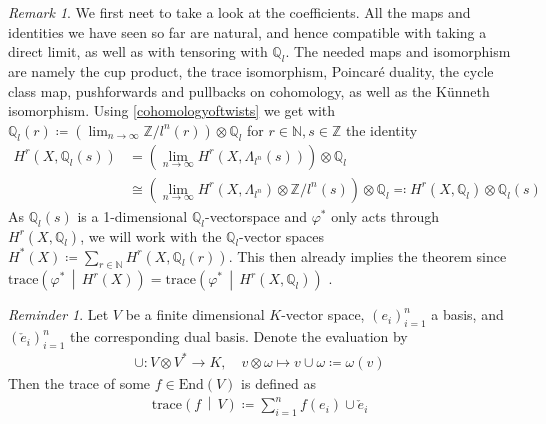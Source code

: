 \documentclass[english,headsepline=0.25pt]{scrartcl}
\theoremstyle{definition}
\theoremstyle{remark}
\newtheorem{Rem}[Def]{Remark}
\newtheorem{Rev}[Def]{Reminder}
\newcommand*{\N}{\mathds{N}}
\newcommand*{\Z}{\mathds{Z}}
\newcommand*{\Q}{\mathds{Q}}
\newcommand*{\Zmod}[1]{\Z/#1} %
\newcommand*{\Zl}{\Z_l} %
\newcommand*{\Ql}{\Q_l} %
\newcommand*{\End}[1]{\text{End}(#1)} %
\newcommand*{\M}{\Lambda}
\newcommand*{\trace}[2]{{\text{trace}\left(#1 \,\middle|\, #2 \right)}} %
\renewcommand*{\phi}{\varphi}
\newcommand*{\dual}[1]{\check{#1}} %
\begin{document}
\begin{Rem}\label{changeofcoefficients}
  We first neet to take a look at the coefficients.
  All the maps and identities we have seen so far are natural,
  and hence compatible with taking a direct limit,
  as well as with tensoring with $\Ql$.
  The needed maps and isomorphism are namely
  the cup product,
  the trace isomorphism,
  Poincaré duality,
  the cycle class map,
  pushforwards and pullbacks on cohomology, as well as
  the Künneth isomorphism.
  Using  \ref{cohomologyoftwists} we get with
  $\Ql(r)\coloneqq\left(\lim_{n\to\infty}\Zmod{l^n}(r)\right)\otimes\Ql$
  for $r\in\N,s\in\Z$ the identity
  \begin{align*}
    H^r(X,\Ql(s)) &=
    \left(\lim_{n\to\infty} H^r(X,\M_{l^n}(s))\right) \otimes \Ql\\
    &\cong
    \left(\lim_{n\to\infty} H^r(X,\M_{l^n})\otimes \Zmod{l^n}(s)\right)\otimes\Ql
    \eqqcolon H^r(X,\Ql)\otimes\Ql(s)
  \end{align*}
  As $\Ql(s)$ is a 1-dimensional $\Ql$-vectorspace and $\phi^*$ only
  acts through $H^r(X,\Ql)$, we will work with the $\Ql$-vector spaces
  $H^*(X)\coloneqq\sum_{r\in\N} H^r(X, \Ql(r))$. This then
  already implies the theorem
  since $\trace{\phi^*}{H^r(X)}=\trace{\phi^*}{H^r(X,\Ql)}$
  \cite[][Rem.~I.25.5]{milne}.
\end{Rem}

\begin{Rev}
  Let $V$ be a finite dimensional $K$-vector space, $(e_i)_{i=1}^n$ a basis,
  and $(\dual e_i)_{i=1}^n$ the corresponding dual basis.
  Denote the evaluation by
  \begin{align*}
    \cup\colon V\otimes V^* \to K,\quad
    v\otimes \omega \mapsto v\cup\omega\coloneqq \omega(v)
  \end{align*}
  Then the trace of some $f\in\End{V}$ is defined as
  \begin{gather*}
    \trace{f}{V} \coloneqq \sum_{i=1}^n f(e_i)\cup \dual e_i
  \end{gather*}
\end{Rev}
\end{document}
